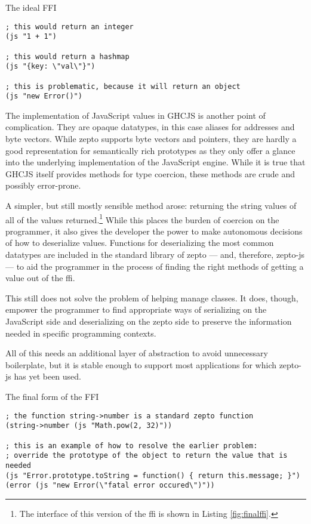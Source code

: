 \documentclass[oneside,11pt,xetex]{scrbook}
\begin{document}
\begin{listing}[H]
\caption{The ideal FFI}
\begin{verbatim}
; this would return an integer
(js "1 + 1")

; this would return a hashmap
(js "{key: \"val\"}")

; this is problematic, because it will return an object
(js "new Error()")
\end{verbatim}
\label{fig:idealffi}
\end{listing}

The implementation of JavaScript values in GHCJS is another point of complication. They
are opaque datatypes, in this case aliases for addresses and byte vectors. While zepto supports
byte vectors and pointers, they are hardly a good representation for semantically rich
prototypes as they only offer a glance into the underlying implementation of the
JavaScript engine. While it is true that GHCJS itself provides methods for type
coercion, these methods are crude and possibly error-prone.

A simpler, but still mostly sensible method arose: returning the string
values of all of the values returned.\footnote{The interface of this version
of the \gls{ffi} is shown in Listing \ref{fig:finalffi}.} While this places the burden of coercion
on the programmer, it also gives the developer the power to make autonomous
decisions of how to deserialize values. Functions for deserializing the most
common datatypes are included in the standard library of zepto --- and, therefore,
zepto-js --- to aid the programmer in the process of finding
the right methods of getting a value out of the \gls{ffi}.

This still does not solve the problem of helping manage classes. It does, though, empower
the programmer to find appropriate ways of serializing on the JavaScript side
and deserializing on the zepto side to preserve the information needed in
specific programming contexts.

All of this needs an additional layer of abstraction to avoid unnecessary
boilerplate, but it is stable enough to support most applications for which zepto-js
has yet been used.

\begin{listing}[H]
\caption{The final form of the FFI}
\begin{verbatim}
; the function string->number is a standard zepto function
(string->number (js "Math.pow(2, 32)"))

; this is an example of how to resolve the earlier problem:
; override the prototype of the object to return the value that is needed
(js "Error.prototype.toString = function() { return this.message; }")
(error (js "new Error(\"fatal error occured\")"))
\end{verbatim}
\label{fig:finalffi}
\end{listing}
\end{document}
